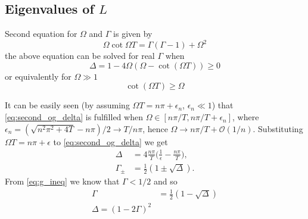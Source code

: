 \documentclass[
a4paper,%
10pt,%
titlepage,%
twoside%
]{article}
\begin{document}

\subsection{Eigenvalues of $L$}

Second equation for $\Omega$ and $\Gamma$ is given by
\begin{equation}
  \label{eq:second_og}
  \Omega\cot{\Omega T}=\Gamma(\Gamma-1)+\Omega^2
\end{equation}
the above equation can be solved for real $\Gamma$ when
\begin{equation}
  \label{eq:second_og_delta}
  \Delta=1-4\Omega(\Omega-\cot(\Omega T))\ge 0
\end{equation}
or equivalently for $\Omega\gg 1$
\begin{equation}
  \cot(\Omega T)\ge\Omega
\end{equation}

It can be easily seen (by assuming $\Omega T=n\pi+\epsilon_n$,
$\epsilon_n\ll 1$) that \eqref{eq:second_og_delta} is fulfilled when
$\Omega\in[n\pi/T,n\pi/T+\epsilon_n]$, where
$\epsilon_n=(\sqrt{n^2\pi^2+4T}-n\pi)/2\rightarrow T/n\pi$, hence
$\Omega\rightarrow n\pi/T+\mathcal{O}(1/n)$. Substituting $\Omega
T=n\pi+\epsilon$ to \eqref{eq:second_og_delta} we get
\begin{align}
  \label{eq:second_og_delta_e}
  \Delta&=4\frac{n\pi}{T}\big(\frac{1}{\epsilon}-\frac{n\pi}{T}),\\
  \Gamma_\pm&=\frac{1}{2}(1\pm\sqrt{\Delta}).
\end{align}
From \eqref{eq:g_ineq} we know that $\Gamma<1/2$ and so
\begin{align}
  \Gamma&=\frac{1}{2}(1-\sqrt{\Delta})\\
  \Delta=(1-2\Gamma)^2
\end{align}

\end{document}
